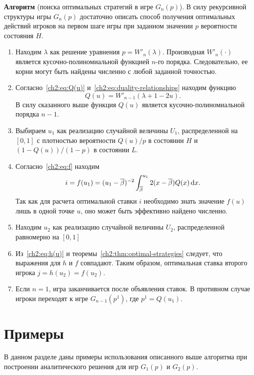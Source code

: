 {\noindent
\textbf{Алгоритм} (поиска оптимальных стратегий в игре $G_n(p)$).
В силу рекурсивной структуры игры $G_n(p)$ достаточно описать способ получения оптимальных действий игроков на первом шаге игры при заданном значении $p$ вероятности состояния $H$.
\begin{enumerate}
\item
  Находим $\lambda$ как решение уравнения 
  $
    p = W'_n(\lambda).
  $
  Производная $W'_n(\cdot)$ является кусочно-полиномиальной функцией $n$-го порядка.
  Следовательно, ее корни могут быть найдены численно с любой заданной точностью.
\item
  Согласно~\eqref{ch2:eq:Q(u)} и~\eqref{ch2:eq:duality-relationships} находим функцию 
  \[
    Q(u) = W'_{n-1}(\lambda + 1 - 2u).
  \]
  В силу сказанного выше функция $Q(u)$ является кусочно-полиномиальной порядка $n-1$.
\item
  Выбираем $u_1$ как реализацию случайной величины $U_1$, распределенной на $[0, 1]$ с плотностью вероятности $Q(u)/p$ в состоянии $H$ и $\left(1 - Q(u)\right)/(1-p)$ в состоянии $L$.
\item
  Согласно~\eqref{ch2:eq:f} находим 
  \[
    i = f(u_1) = (u_1 - {\overline{\beta}})^{-2} \int_{{\overline{\beta}}}^{u_1} 2 (x - {\overline{\beta}}) Q(x) \mathop{}\!\mathrm{d} x.
  \]
  Так как для расчета оптимальной ставки $i$ необходимо знать значение $f(u)$ лишь в одной точке $u$, оно может быть эффективно найдено численно.
\item
  Находим $u_2$ как реализацию случайной величины $U_2$, распределенной равномерно на $[0, 1]$
\item
  Из~\eqref{ch2:eq:h(u)} и теоремы~\ref{ch2:thm:optimal-strategies} следует, что выражения для $h$ и $f$ совпадают.
  Таким образом, оптимальная ставка второго игрока $j = h(u_2) = f(u_2)$.
\item
  Если $n = 1$, игра заканчивается после объявления ставок. В противном случае игроки переходят к игре $G_{n-1}(p^1)$, где $p^1 = Q(u_1)$.
\end{enumerate}

\section{Примеры}
В данном разделе даны примеры использования описанного выше алгоритма при построении аналитического решения для игр $G_1(p)$ и $G_2(p)$.

}
